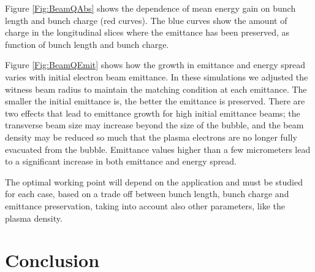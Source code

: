 \documentclass[aps,prstab,reprint,amsmath,amssymb,groupedaddress,onecolumn]{revtex4-1}
\begin{document}
Figure \ref{Fig:BeamQAbs} shows the dependence of mean energy gain on bunch length and bunch charge %
(red curves). The blue curves show the amount of charge in the longitudinal slices where the emittance has been preserved, as function of bunch length and bunch charge.

Figure \ref{Fig:BeamQEmit} shows how the growth in emittance and energy spread varies with initial electron beam
emittance.  In these simulations %
we adjusted the witness beam radius to maintain the matching condition at each emittance. The smaller the initial emittance is, the better the emittance is preserved. There are two effects that lead
to emittance growth for high initial emittance beams; the transverse beam size may increase beyond the size of the bubble, and the beam
density may be reduced so much that the plasma electrons are no longer fully evacuated from the bubble. Emittance
values higher than a few micrometers lead to a significant increase in both emittance and energy spread. 

The optimal working point will depend on the application and must be studied for each case, based on a trade off between bunch length, bunch charge and emittance preservation, taking into account also other parameters, like the plasma density.   

\section{Conclusion}\label{S:C}

\end{document}
